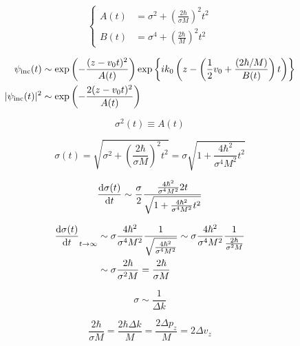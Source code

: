 \begin{equation}
\nonumber
\left\{
\begin{split}
A(t) &= \sigma^2 + \left( \frac{2\hbar}{\sigma M} \right)^2 t^2 \\
B(t) &= \sigma^4 + \left( \frac{2\hbar}{M} \right)^2 t^2
\end{split}
\right.
\end{equation}

\begin{equation}
\nonumber
\begin{split}
\psi_{\rm inc}(t) &\sim {\rm exp} \left( -\frac{(z - v_0 t)^2}{A(t)} \right) {\rm exp} \left\{ i k_0 \left( z - \left( \frac{1}{2} v_0 + \frac{(2 \hbar/M)}{B(t)} \right) t \right) \right\} \\
|\psi_{\rm inc}(t)|^2 &\sim {\rm exp} \left( - \frac{2 (z - v_0 t)^2}{A(t)} \right)
\end{split}
\end{equation}

\begin{equation}
\nonumber
\sigma^2(t) \equiv A(t)
\end{equation}

\begin{equation}
\nonumber
\sigma(t) = \sqrt{\sigma^2 + \left( \frac{2 \hbar}{\sigma M} \right)^2 t^2} = \sigma \sqrt{1 + \frac{4 \hbar^2}{\sigma^4 M^2} t^2}
\end{equation}

\begin{equation}
\nonumber
\frac{{\rm d}\sigma(t)}{{\rm d}t} \sim \frac{\sigma}{2} \frac{\frac{4 \hbar^2}{\sigma^4 M^2} 2 t}{\sqrt{1 + \frac{4 \hbar^2}{\sigma^4 M^2} t^2}}
\end{equation}

\begin{equation}
\nonumber
\begin{split}
\frac{{\rm d}\sigma(t)}{{\rm d}t}_{t \rightarrow \infty} &\sim \sigma \frac{4 \hbar^2}{\sigma^4 M^2} \frac{1}{\sqrt{\frac{4 \hbar^2}{\sigma^4 M^2}}} \sim \sigma \frac{4 \hbar^2}{\sigma^4 M^2} \frac{1}{\frac{2 \hbar}{\sigma^2 M}} \\
&\sim \sigma \frac{2 \hbar}{\sigma^2 M} = \frac{2 \hbar}{\sigma M}
\end{split}
\end{equation}


\begin{equation}
\nonumber
\sigma \sim \frac{1}{\Delta k}
\end{equation}

\begin{equation}
\nonumber
\frac{2 \hbar}{\sigma M} = \frac{2 \hbar \Delta k}{M} = \frac{2 \Delta p_z}{M} = 2 \Delta v_z
\end{equation}



